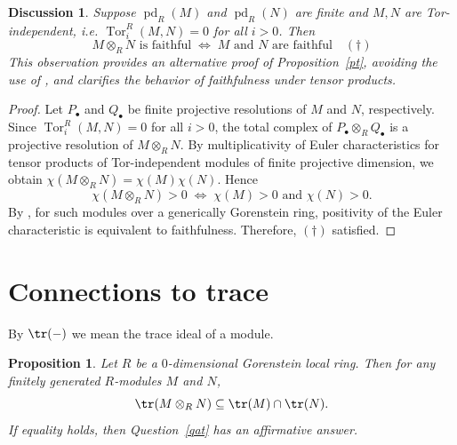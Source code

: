 \documentclass[11pt,a4paper]{amsart}
\numberwithin{equation}{section}
\newtheorem{proposition}[theorem]{Proposition}
\newtheorem{discussion}[theorem]{Discussion}
\DeclareMathOperator{\pd}{pd}
\DeclareMathOperator{\Tor}{Tor}
\begin{document}
\begin{discussion}\label{dist}
	Suppose $\pd_R(M)$ and $\pd_R(N)$ are finite and $M,N$ are Tor-independent, i.e.
	$\Tor^R_i(M,N)=0$ for all $i>0$. Then
	\[
	M\otimes_R N \text{ is faithful}
	\;\Longleftrightarrow\;
	M \text{ and } N \text{ are faithful}\quad(\dagger)
	\]
	This observation provides an alternative proof of Proposition~\ref{pt}, avoiding the use of \cite{berg}, and clarifies the behavior of faithfulness under tensor products.
\end{discussion}

\begin{proof}
	Let $P_\bullet$ and $Q_\bullet$ be finite projective resolutions of $M$ and $N$, respectively. Since $\Tor^R_i(M,N)=0$ for all $i>0$, the total complex of $P_\bullet\otimes_R Q_\bullet$ is a projective resolution of $M\otimes_R N$. 
	By multiplicativity of Euler characteristics for tensor products of Tor-independent modules of finite projective dimension, we obtain
	\(
	\chi(M\otimes_R N)=\chi(M)\chi(N).
	\)
	Hence
	\[
	\chi(M\otimes_R N)>0
	\;\Longleftrightarrow\;
	\chi(M)>0 \text{ and } \chi(N)>0.
	\]
	By \cite[Proposition 2.26]{wol}, for such modules over a generically Gorenstein ring,
	positivity of the Euler characteristic is equivalent to faithfulness. Therefore,
	$(\dagger)$ satisfied.
\end{proof}


	\maketitle
	
\section{Connections to trace}


By $\tr(-)$ we mean the trace ideal of a module.

\begin{proposition}
	Let $R$ be a $0$-dimensional Gorenstein local ring. Then for any finitely generated $R$-modules $M$ and $N$,
	\[
	\tr(M \otimes_R N) \subseteq \tr(M) \cap \tr(N).
	\]
	If equality holds, then Question~\ref{qat} has an affirmative answer.
\end{proposition}
\end{document}
